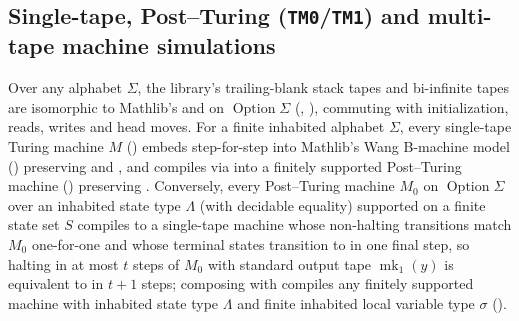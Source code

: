 \begin{result}
\subsection{Single-tape, Post--Turing (\texttt{TM0}/\texttt{TM1}) and multi-tape machine simulations}
Over any alphabet $\Sigma$, the library's trailing-blank stack tapes and bi-infinite
tapes are isomorphic to Mathlib's  and  on
$\operatorname{Option}\Sigma$ (,
), commuting with initialization, reads, writes and head
moves. For a finite inhabited alphabet $\Sigma$, every single-tape Turing machine
$M$ () embeds step-for-step into Mathlib's Wang B-machine model
 () preserving  and
, and compiles via  into a finitely
supported Post--Turing machine  () preserving
. Conversely, every Post--Turing machine $M_0$ on
$\operatorname{Option}\Sigma$ over an inhabited state type $\Lambda$ (with decidable
equality) supported on a finite state set $S$ compiles to a single-tape machine
 whose non-halting transitions match $M_0$ one-for-one and whose
terminal states transition to  in one final step, so halting in at most
$t$ steps of $M_0$ with standard output tape $\operatorname{mk}_1(y)$ is equivalent
to  in $t+1$ steps; composing with 
compiles any finitely supported  machine with inhabited state type
$\Lambda$ and finite inhabited local variable type $\sigma$ ().


\end{result}
